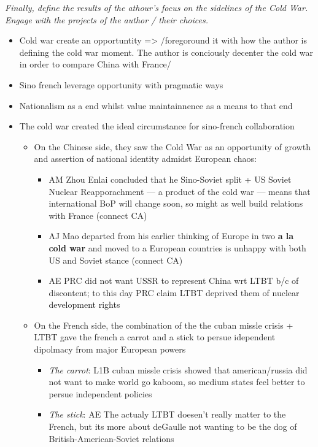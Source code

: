 \documentclass[letterpaper]{article}
\begin{document}
\emph{Finally, define the results of the athour's focus on the sidelines of
the Cold War. Engage with the projects of the author / their choices.}

\begin{itemize}
\item Cold war create an opportuntity => /foregoround it with how the author
is defining the cold war moment. The author is conciously decenter the
cold war in order to compare China with France/

\item Sino french leverage opportunity with pragmatic ways

\item Nationalism as a end whilst value maintainnence as a means to that end

\item The cold war created the ideal circumstance for sino-french
collaboration

\begin{itemize}
\item On the Chinese side, they saw the Cold War as an opportunity of
growth and assertion of national identity admidst European chaos:

\begin{itemize}
\item AM Zhou Enlai concluded that he Sino-Soviet split + US Soviet
Nuclear Reapporachment --- a product of the cold war --- means
that international BoP will change soon, so might as well build
relations with France (connect CA)
\item AJ Mao departed from his earlier thinking of Europe in two \textbf{a la
cold war} and moved to a European countries is unhappy with both
US and Soviet stance (connect CA)
\item AE PRC did not want USSR to represent China wrt LTBT b/c of
discontent; to this day PRC claim LTBT deprived them of nuclear
development rights
\end{itemize}

\item On the French side, the combination of the the cuban missle crisis +
LTBT gave the french a carrot and a stick to persue idependent
dipolmacy from major European powers

\begin{itemize}
\item \emph{The carrot}: L1B cuban missle crisis showed that american/russia
did not want to make world go kaboom, so medium states feel better
to persue independent policies
\item \emph{The stick}: AE The actualy LTBT doesen't really matter to the
French, but its more about deGaulle not wanting to be the dog of
British-American-Soviet relations
\end{itemize}
\end{itemize}


\end{itemize}
\end{document}
